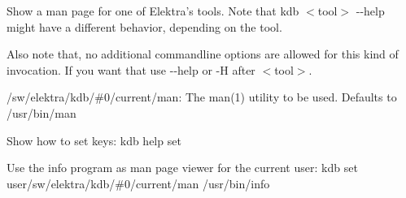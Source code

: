 
\begin{DoxyCode}{0}
\end{DoxyCode}


Show a man page for one of Elektra’s tools. Note that {\ttfamily kdb $<$tool$>$ -\/-\/help} might have a different behavior, depending on the tool.

Also note that, no additional commandline options are allowed for this kind of invocation. If you want that use {\ttfamily -\/-\/help} or {\ttfamily -\/H} after {\ttfamily $<$tool$>$}.


\begin{DoxyItemize}
\item {\ttfamily /sw/elektra/kdb/\#0/current/man}\+: The man(1) utility to be used. Defaults to /usr/bin/man
\end{DoxyItemize}

Show how to set keys\+: {\ttfamily kdb help set}

Use the info program as man page viewer for the current user\+: {\ttfamily kdb set user/sw/elektra/kdb/\#0/current/man /usr/bin/info} 